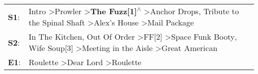 \begin{supertabular}{p{0.03\textwidth}p{0.92\textwidth}}
 \textbf{S1}:  &  Intro\textsuperscript{} \textgreater \enspace Prowler\textsuperscript{} \textgreater \enspace \textbf{The Fuzz[1]\textsuperscript{$\wedge$}} \textgreater \enspace Anchor Drops\textsuperscript{}, \enspace Tribute to the Spinal Shaft\textsuperscript{} \textgreater \enspace Alex's House\textsuperscript{} \textgreater \enspace Mail Package\textsuperscript{}  \enspace  \\
 \textbf{S2}:  &                        In The Kitchen\textsuperscript{}, \enspace Out Of Order\textsuperscript{} \textgreater \enspace FF[2]\textsuperscript{} \textgreater \enspace Space Funk Booty\textsuperscript{}, \enspace Wife Soup[3]\textsuperscript{} \textgreater \enspace Meeting in the Aisle\textsuperscript{} \textgreater \enspace Great American\textsuperscript{}  \enspace  \\
 \textbf{E1}:  &                                                                                                                                                                                                                                        Roulette\textsuperscript{} \textgreater \enspace Dear Lord\textsuperscript{} \textgreater \enspace Roulette\textsuperscript{}  \enspace  \\
\end{supertabular}
